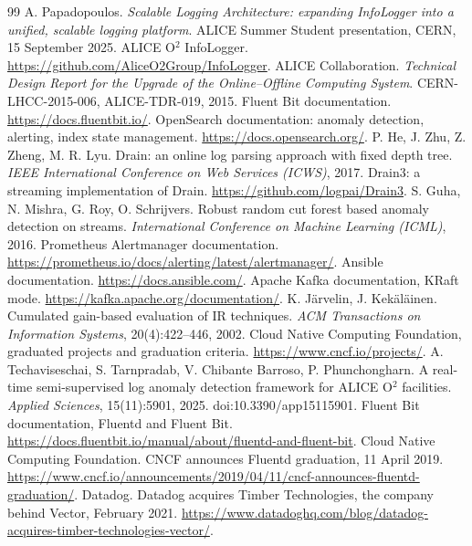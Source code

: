 {\small
\begin{thebibliography}{99}
 A. Papadopoulos. \emph{Scalable Logging Architecture: expanding InfoLogger into a unified, scalable logging platform}. ALICE Summer Student presentation, CERN, 15 September 2025.
 ALICE O$^2$ InfoLogger. \url{https://github.com/AliceO2Group/InfoLogger}.
 ALICE Collaboration. \emph{Technical Design Report for the Upgrade of the Online--Offline Computing System}. CERN-LHCC-2015-006, ALICE-TDR-019, 2015.
 Fluent Bit documentation. \url{https://docs.fluentbit.io/}.
 OpenSearch documentation: anomaly detection, alerting, index state management. \url{https://docs.opensearch.org/}.
 P. He, J. Zhu, Z. Zheng, M. R. Lyu. Drain: an online log parsing approach with fixed depth tree. \emph{IEEE International Conference on Web Services (ICWS)}, 2017.
 Drain3: a streaming implementation of Drain. \url{https://github.com/logpai/Drain3}.
 S. Guha, N. Mishra, G. Roy, O. Schrijvers. Robust random cut forest based anomaly detection on streams. \emph{International Conference on Machine Learning (ICML)}, 2016.
 Prometheus Alertmanager documentation. \url{https://prometheus.io/docs/alerting/latest/alertmanager/}.
 Ansible documentation. \url{https://docs.ansible.com/}.
 Apache Kafka documentation, KRaft mode. \url{https://kafka.apache.org/documentation/}.
 K. J\"arvelin, J. Kek\"al\"ainen. Cumulated gain-based evaluation of IR techniques. \emph{ACM Transactions on Information Systems}, 20(4):422--446, 2002.
 Cloud Native Computing Foundation, graduated projects and graduation criteria. \url{https://www.cncf.io/projects/}.
 A. Techaviseschai, S. Tarnpradab, V. Chibante Barroso, P. Phunchongharn. A real-time semi-supervised log anomaly detection framework for ALICE O$^2$ facilities. \emph{Applied Sciences}, 15(11):5901, 2025. doi:10.3390/app15115901.
 Fluent Bit documentation, Fluentd and Fluent Bit. \url{https://docs.fluentbit.io/manual/about/fluentd-and-fluent-bit}.
 Cloud Native Computing Foundation. CNCF announces Fluentd graduation, 11 April 2019. \url{https://www.cncf.io/announcements/2019/04/11/cncf-announces-fluentd-graduation/}.
 Datadog. Datadog acquires Timber Technologies, the company behind Vector, February 2021. \url{https://www.datadoghq.com/blog/datadog-acquires-timber-technologies-vector/}.

\end{thebibliography}}
